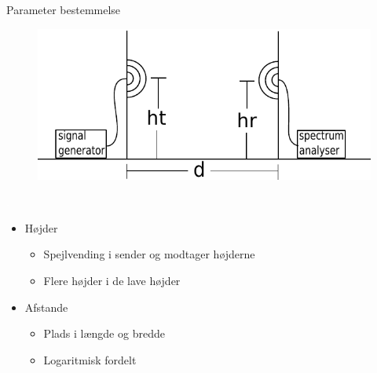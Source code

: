\begin{frame}{Parameter bestemmelse}
\begin{figure}[!htbp]
	\centering
	\includegraphics[width = 0.8\columnwidth]{figures/setup.pdf}
\end{figure}
\begin{minipage}{0.15\textwidth}
 \textcolor{white}{.}  
\end{minipage}%
\begin{minipage}{0.8\textwidth}
\begin{itemize}
\item Højder
\begin{itemize}
\item Spejlvending i sender og modtager højderne
\item Flere højder i de lave højder
\end{itemize}
\item Afstande
\begin{itemize}
\item Plads i længde og bredde
\item Logaritmisk fordelt
\end{itemize}
\end{itemize}
\end{minipage}
\end{frame}


